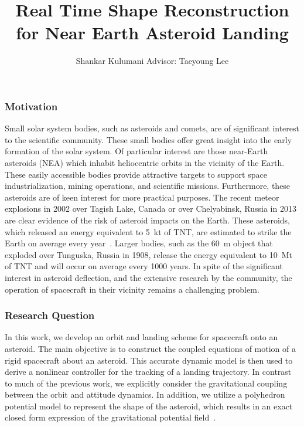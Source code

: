 \documentclass[11pt,reqno,twocolumn]{article} %
\title{Real Time Shape Reconstruction for Near Earth Asteroid Landing}
\author{Shankar Kulumani Advisor: Taeyoung Lee}
\date{} %
\begin{document}
\maketitle
\subsubsection*{Motivation}
Small solar system bodies, such as asteroids and comets, are of significant interest to the scientific community.
These small bodies offer great insight into the early formation of the solar system.
Of particular interest are those near-Earth asteroids (NEA) which inhabit heliocentric orbits in the vicinity of the Earth.
These easily accessible bodies provide attractive targets to support space industrialization, mining operations, and scientific missions.
Furthermore, these asteroids are of keen interest for more practical purposes.
The recent meteor explosions in  2002 over Tagish Lake, Canada or over Chelyabinsk, Russia in 2013 are clear evidence of the risk of asteroid impacts on the Earth.
These asteroids, which released an energy equivalent to \SI{5}{\kilo\tonne} of TNT, are estimated to strike the Earth on average every year~\cite{brown2002}.
Larger bodies, such as the \SI{60}{\meter} object that exploded over Tunguska, Russia in 1908, release the energy equivalent to \SI{10}{\mega\tonne} of TNT and will occur on average every \num{1000} years.
In spite of the significant interest in asteroid deflection, and the extensive research by the community, the operation of spacecraft in their vicinity remains a challenging problem.

\subsubsection*{Research Question}


In this work, we develop an orbit and landing scheme for spacecraft onto an asteroid.
The main objective is to construct the coupled equations of motion of a rigid spacecraft about an asteroid.
This accurate dynamic model is then used to derive a nonlinear controller for the tracking of a landing trajectory.
In contrast to much of the previous work, we explicitly consider the gravitational coupling between the orbit and attitude dynamics.
In addition, we utilize a polyhedron potential model to represent the shape of the asteroid, which results in an exact closed form expression of the gravitational potential field~\cite{werner1994,werner1996}.
\end{document}
